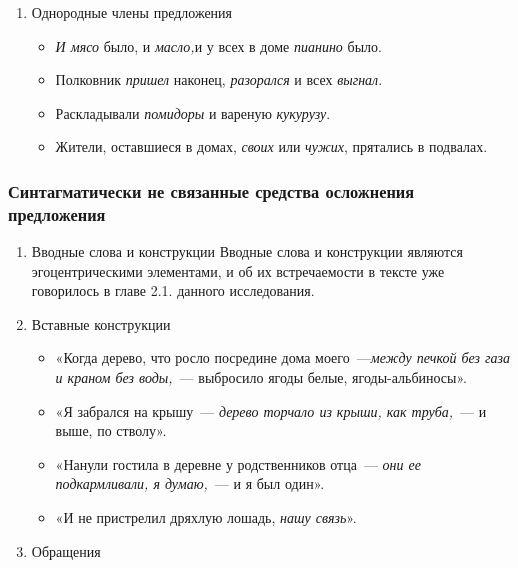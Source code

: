 \documentclass{kursa4}
\begin{document}
{\begin{enumerate}
            \item Однородные члены предложения
            \begin{itemize}
              \item \textit{И мясо} было, и \textit{масло,}и у всех в доме \textit{пианино} было. 
              \item Полковник \textit{пришел} наконец, \textit{разорался} и всех \textit{выгнал}.
              \item Раскладывали \textit{помидоры} и вареную \textit{кукурузу}.
              \item Жители, оставшиеся в домах, \textit{своих} или \textit{чужих}, прятались в подвалах.
            \end{itemize}
          \end{enumerate}

      \subsubsection{Синтагматически не связанные средства осложнения предложения}

        \begin{enumerate}
          \item Вводные слова и конструкции \newline
          Вводные слова и конструкции являются
          эгоцентрическими элементами, и об их встречаемости в тексте уже
          говорилось в главе 2.1. данного исследования. 

          \item Вставные конструкции

          \begin{itemize}
            \item «Когда дерево, что росло посредине дома моего~---\textit{между печкой без газа и краном без воды,}~--- выбросило ягоды белые, ягоды-альбиносы».
            \item «Я забрался на крышу~--- \textit{дерево торчало из крыши, как труба,}~--- и выше, по стволу».
            \item «Нанули гостила в деревне у родственников отца~--- \textit{они ее подкармливали, я думаю,}~--- и я был один».
            \item «И не пристрелил дряхлую лошадь, \textit{нашу связь}».
          \end{itemize}

          \item Обращения


\end{enumerate}}
\end{document}
